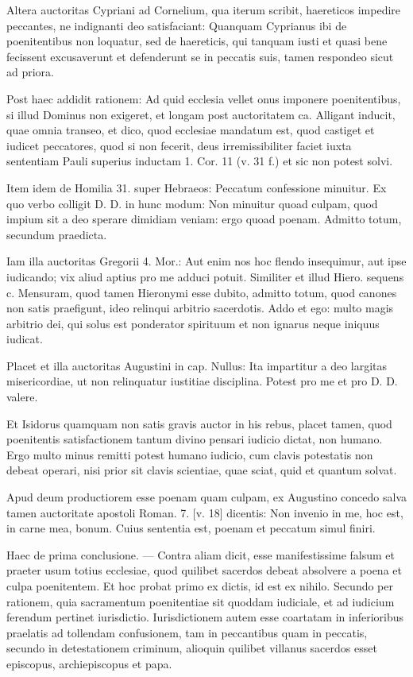 Altera auctoritas Cypriani ad Cornelium, qua iterum scribit, haereticos impedire peccantes, ne indignanti deo satisfaciant: Quanquam Cyprianus ibi de poenitentibus non loquatur, sed de haereticis, qui tanquam iusti et quasi bene fecissent excusaverunt et defenderunt se in peccatis suis, tamen respondeo sicut ad priora.

Post haec addidit rationem: Ad quid ecclesia vellet onus imponere poenitentibus, si illud Dominus non exigeret, et longam post auctoritatem ca. Alligant inducit, quae omnia transeo, et dico, quod ecclesiae mandatum est, quod castiget et iudicet peccatores, quod si non fecerit, deus irremissibiliter faciet iuxta sententiam Pauli superius inductam 1. Cor. 11 (v. 31 f.) et sic non potest solvi.

\marginpar{\small[378]} Item idem de Homilia 31. super Hebraeos: Peccatum confessione minuitur. Ex quo verbo colligit D. D. in hunc modum: Non minuitur quoad culpam, quod impium sit a deo sperare dimidiam veniam: ergo quoad poenam. Admitto totum, secundum praedicta.

Iam illa auctoritas Gregorii 4. Mor.: Aut enim nos hoc flendo insequimur, aut ipse iudicando; vix aliud aptius pro me adduci potuit. Similiter et illud Hiero. sequens c. Mensuram, quod tamen Hieronymi esse dubito, admitto totum, quod canones non satis praefigunt, ideo relinqui arbitrio sacerdotis. Addo et ego: multo magis arbitrio dei, qui solus est ponderator spirituum et non ignarus neque iniquus iudicat.

Placet et illa auctoritas Augustini in cap. Nullus: Ita impartitur a deo largitas misericordiae, ut non relinquatur iustitiae disciplina. Potest pro me et pro D. D. valere.

Et Isidorus quamquam non satis gravis auctor in his rebus, placet tamen, quod poenitentis satisfactionem tantum divino pensari iudicio dictat, non humano. Ergo multo minus remitti potest humano iudicio, cum clavis potestatis non debeat operari, nisi prior sit clavis scientiae, quae sciat, quid et quantum solvat.

Apud deum productiorem esse poenam quam culpam, ex Augustino concedo salva tamen auctoritate apostoli Roman. 7. [v. 18] dicentis: Non invenio in me, hoc est, in carne mea, bonum. Cuius sententia est, poenam et peccatum simul finiri.

Haec de prima conclusione. — Contra aliam dicit, esse manifestissime falsum et praeter usum totius ecclesiae, quod quilibet sacerdos debeat absolvere a poena et culpa poenitentem. Et hoc probat primo ex dictis, id est ex nihilo. Secundo per rationem, quia sacramentum poenitentiae sit quoddam iudiciale, et ad iudicium ferendum pertinet iurisdictio. Iurisdictionem autem esse coartatam in inferioribus praelatis ad tollendam confusionem, tam in peccantibus quam in peccatis, secundo in detestationem criminum, alioquin quilibet villanus sacerdos esset episcopus, archiepiscopus et papa.

